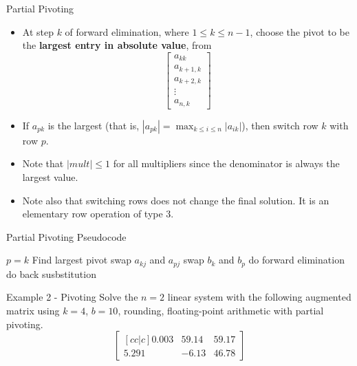 \documentclass[12pt]{beamer}
\begin{document}
\begin{frame}{Partial Pivoting}

\begin{itemize}

\item{At step $k$ of forward elimination, where $1 \leq k \leq n-1$, choose the pivot to be the {\bf largest entry in absolute value}, from
\[
\begin{bmatrix}
	a_{kk} \\
	a_{k+1,k} \\
	a_{k+2,k} \\
	\vdots \\
	a_{n,k}
\end{bmatrix}
\]
}
\item{If $a_{pk}$ is the largest (that is, $|a_{pk}|=\max_{k \leq i \leq n}|a_{ik}|$), then switch row $k$ with row $p$. }
\item{Note that $|mult| \leq 1$ for all multipliers since the denominator is always the largest value.}
\item{Note also that switching rows does not change the final solution. It is an elementary row operation of type 3.}
\end{itemize}

\end{frame}

\begin{frame}{Partial Pivoting Pseudocode}
\begin{algorithm}[H]
\begin{algorithmic}[1]
\STATE $p = k$
\STATE Find largest pivot
\ENDFOR
{}
\STATE swap $a_{kj}$ and $a_{pj}$
\ENDFOR
\STATE swap $b_{k}$ and $b_{p}$
\ENDIF
\STATE do forward elimination
\ENDFOR
\STATE do back susbstitution
\end{algorithmic}
\caption{pseudocode for partial pivoting}
\label{alg:seq}
\end{algorithm}
\end{frame} 

\begin{frame}{Example 2 - Pivoting}
Solve the $n=2$ linear system with the following augmented matrix using $k=4$, $b=10$, rounding, floating-point arithmetic with partial pivoting.
\[
\begin{bmatrix}[cc|c]
	0.003	&	59.14	&	59.17 \\
	5.291		&	-6.13	&	46.78
\end{bmatrix}
\]
\vspace{2 in}

\end{frame}
\end{document}
